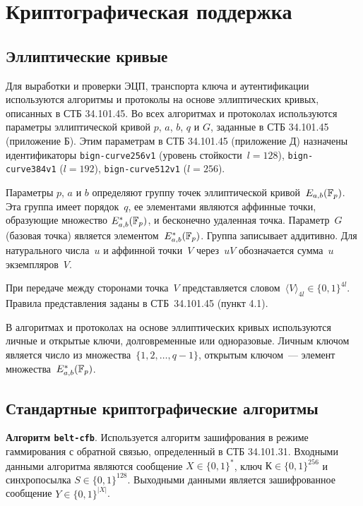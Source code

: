 \chapter{Криптографическая поддержка}\label{CRYPTO}

\section{Эллиптические кривые}\label{CRYPTO.EC}

Для выработки и проверки ЭЦП, транспорта ключа и аутентификации используются 
алгоритмы и протоколы на основе эллиптических кривых, описанных в СТБ 
34.101.45.
%
Во всех алгоритмах и протоколах используются параметры эллиптической кривой 
$p$, $a$, $b$, $q$ и $G$, заданные в СТБ 34.101.45 (приложение Б).
Этим параметрам в СТБ 34.101.45 (приложение Д) назначены идентификаторы
\texttt{bign-curve256v1} (уровень стойкости~$l=128$), 
\texttt{bign-curve384v1} ($l=192$), \texttt{bign-curve512v1} ($l=256$).

Параметры $p$, $a$ и $b$ определяют группу точек эллиптической
кривой~$E_{a,b}(\mathbb{F}_p)$. Эта группа имеет порядок~$q$, ее элементами
являются аффинные точки, образующие множество $E_{a,b}^*(\mathbb{F}_p)$, и
бесконечно удаленная точка. Параметр~$G$ (базовая точка) является
элементом~$E_{a,b}^*(\mathbb{F}_p)$. Группа записывает аддитивно. Для натурального
числа~$u$ и аффинной точки~$V$ через~$uV$ обозначается сумма~$u$
экземпляров~$V$.

При передаче между сторонами точка~$V$ представляется 
словом~$\langle V\rangle_{4l}\in\{0,1\}^{4l}$. Правила представления заданы 
в СТБ~34.101.45 (пункт 4.1).

В алгоритмах и протоколах на основе эллиптических кривых используются 
личные и открытые ключи, долговременные или одноразовые. Личным ключом 
является число из множества~$\{1, 2,\ldots, q-1\}$, открытым ключом~--- 
элемент множества~$E_{a,b}^*(\mathbb{F}_p)$.

\section{Стандартные криптографические алгоритмы}
\label{CRYPTO.StdAlg}

{\bf Алгоритм \texttt{belt-cfb}}.
Используется алгоритм зашифрования в режиме 
гаммирования с обратной связью, определенный в СТБ 34.101.31. 
Входными данными алгоритма являются сообщение $X\in\{0,1\}^*$, 
ключ $К\in\{0,1\}^{256}$ и синхропосылка $S\in\{0,1\}^{128}$.
Выходными данными является зашифрованное сообщение $Y\in\{0,1\}^{|X|}$.

